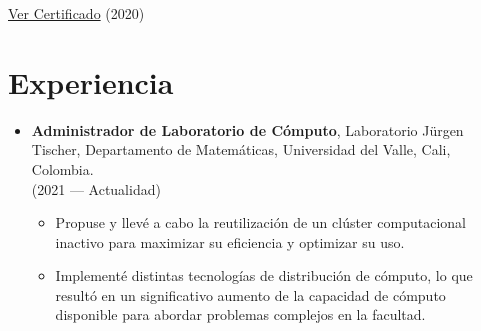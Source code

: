 \documentclass{article}
\begin{document}
\begin{multicols}{2}
\begin{minipage}{0.45\textwidth}
\begin{itemize}[leftmargin=*,itemsep=-1pt]
            \href{https://drive.google.com/file/d/1YcQ8o4VEdY574_22zUCQ45kumSQgd-qN/view?usp=sharing}{Ver
              Certificado}
            (2020)
    \end{itemize}
  \end{minipage}
\end{multicols}
\section*{Experiencia}
\begin{itemize}[leftmargin=*]

  \item \textbf{Administrador de Laboratorio de Cómputo}, Laboratorio
        Jürgen
        Tischer, Departamento de Matemáticas,
        Universidad del Valle, Cali,
        Colombia. \\
        (2021 --- Actualidad)
        \begin{itemize}[itemsep=-1pt]
          \item Propuse y llevé a cabo la reutilización
                de un clúster
                computacional inactivo para maximizar su eficiencia y
                optimizar
                su uso.
          \item Implementé distintas tecnologías de
                distribución de cómputo, lo que resultó en un significativo
                aumento de la capacidad de cómputo disponible para abordar
                problemas complejos
                en la facultad.
        \end{itemize}
\end{itemize}
\end{document}
